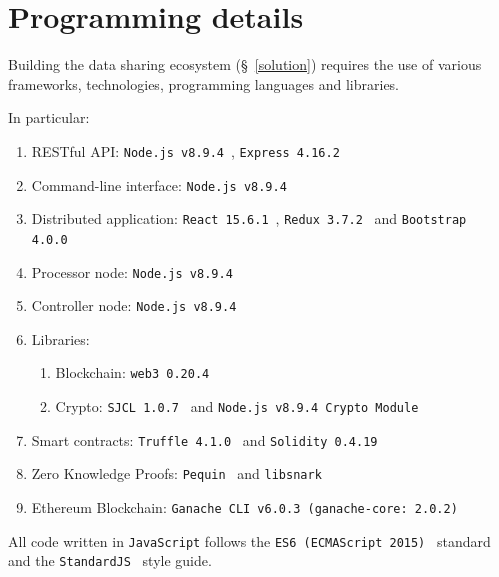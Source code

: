\section{Programming details}
\label{implemenation:details}

Building the data sharing ecosystem (§~\ref{solution}) requires the use of various frameworks, technologies, programming languages and libraries.

In particular:

\begin{enumerate}
  \item RESTful API: \verb|Node.js v8.9.4|~\cite{nodejs}, \verb|Express 4.16.2|~\cite{expressjs}
  \item Command-line interface: \verb|Node.js v8.9.4|
  \item Distributed application: \verb|React 15.6.1|~\cite{react}, \verb|Redux 3.7.2|~\cite{redux} and \verb|Bootstrap 4.0.0|~\cite{bootstrap}
  \item Processor node: \verb|Node.js v8.9.4|
  \item Controller node: \verb|Node.js v8.9.4|
  \item Libraries:
    \begin{enumerate}
      \item Blockchain: \verb|web3 0.20.4|~\cite{web3js}
      \item Crypto: \verb|SJCL 1.0.7|~\cite{sjcl} and \verb|Node.js v8.9.4 Crypto Module|
    \end{enumerate}
  \item Smart contracts: \verb|Truffle 4.1.0|~\cite{truffle} and \verb|Solidity 0.4.19|~\cite{solidity}
  \item Zero Knowledge Proofs: \verb|Pequin|~\cite{pequin} and \verb|libsnark|~\cite{libsnark}
  \item Ethereum Blockchain: \verb|Ganache CLI v6.0.3 (ganache-core: 2.0.2)|~\cite{ganache}
\end{enumerate}

All code written in \verb|JavaScript| follows the \verb|ES6 (ECMAScript 2015)|~\cite{ECMA_2015} standard and the  \verb|StandardJS|~\cite{stdjs} style guide.

